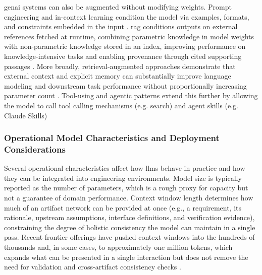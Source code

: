 

\ac{genai} systems can also be augmented without modifying weights. Prompt engineering and in-context learning condition the model via examples, formats, and constraints embedded in the input \cite{minaee_LargeLanguageModelsSurvey_2025}. \ac{rag} conditions outputs on external references fetched at runtime, combining parametric knowledge in model weights with non-parametric knowledge stored in an index, improving performance on knowledge-intensive tasks and enabling provenance through cited supporting passages \cite{lewis_RetrievalAugmentedGenerationKnowledgeIntensive_2021}. More broadly, retrieval-augmented approaches demonstrate that external context and explicit memory can substantially improve language modeling and downstream task performance without proportionally increasing parameter count \cite{borgeaud_ImprovingLanguageModelsRetrieving_2022}. Tool-using and agentic patterns extend this further by allowing the model to call tool calling mechanisms (e.g. search) and agent skills (e.g. Claude Skills) \cite{anthropic_DonatingModelContext_2025, thelinuxfoundation_LinuxFoundationAnnouncesMCP_2025, bandi_MCPAtlasLargeScaleBenchmarkToolUse_2026, anthropic_ExtendClaudeSkills_2026, barres_t2BenchEvaluatingConversationalAgents_2025}


\subsubsection{Operational Model Characteristics and Deployment Considerations}
\label{subsec:llm_ops_characteristics}

Several operational characteristics affect how \acp{llm} behave in practice and how they can be integrated into engineering environments. Model size is typically reported as the number of parameters, which is a rough proxy for capacity but not a guarantee of domain performance. Context window length determines how much of an artifact network can be provided at once (e.g., a requirement, its rationale, upstream assumptions, interface definitions, and verification evidence), constraining the degree of holistic consistency the model can maintain in a single pass. Recent frontier offerings have pushed context windows into the hundreds of thousands and, in some cases, to approximately one million tokens, which expands what can be presented in a single interaction but does not remove the need for validation and cross-artifact consistency checks \cite{logankilpatrick_Gemini15Pro2M_2024, anthropic_IntroducingSonnet46_2026}.

